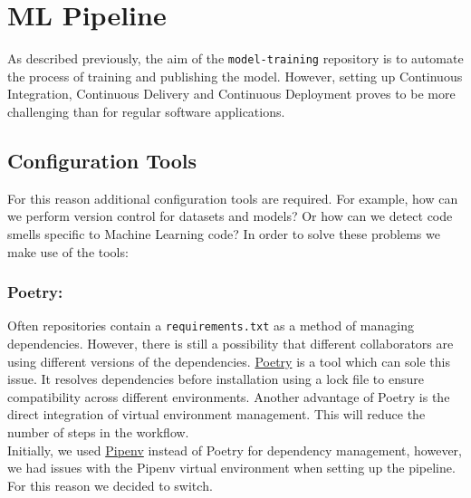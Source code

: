 
\section{ML Pipeline}
As described previously, the aim of the \texttt{model-training} repository is to automate the process of training and publishing the model. However, setting up Continuous Integration, Continuous Delivery and Continuous Deployment proves to be more challenging than for regular software applications. 

\subsection{Configuration Tools}
For this reason additional configuration tools are required. For example, how can we perform version control for datasets and models? Or how can we detect code smells specific to Machine Learning code?
In order to solve these problems we make use of the tools:

\subsubsection{Poetry:}
Often repositories contain a \texttt{requirements.txt} as a method of managing dependencies. However, there is still a possibility that different collaborators are using different versions of the dependencies. {\color{blue} \href{https://python-poetry.org/}{Poetry}} is a tool which can sole this issue. It resolves dependencies before installation using a lock file to ensure compatibility across different environments. Another advantage of Poetry is the direct integration of virtual environment management. This will reduce the number of steps in the workflow. \\
Initially, we used {\color{blue} \href{https://pipenv.pypa.io/en/latest/}{Pipenv}} instead of Poetry for dependency management, however, we had issues with the Pipenv virtual environment when setting up the pipeline. For this reason we decided to switch.

